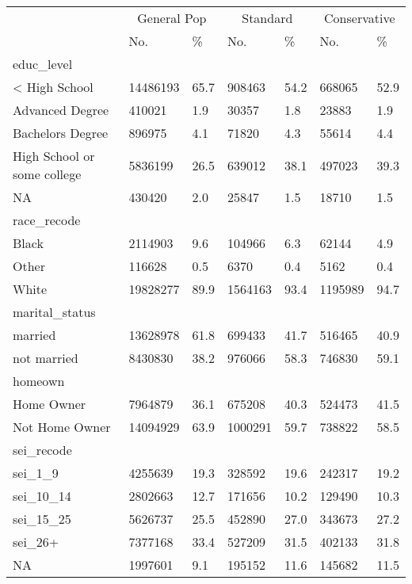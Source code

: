 \captionsetup[table]{labelformat=empty,skip=1pt}
\begin{longtable}{lllllll}
\toprule
& \multicolumn{2}{c}{General Pop} & \multicolumn{2}{c}{Standard} & \multicolumn{2}{c}{Conservative} \\ 
 \cmidrule(lr){2-3}\cmidrule(lr){4-5}\cmidrule(lr){6-7}
 & No. & \% & No. & \% & No. & \% \\ 
\midrule
\multicolumn{1}{l}{educ\_level} \\ 
\midrule
< High School & 14486193 & 65.7 & 908463 & 54.2 & 668065 & 52.9 \\ 
Advanced Degree & 410021 & 1.9 & 30357 & 1.8 & 23883 & 1.9 \\ 
Bachelors Degree & 896975 & 4.1 & 71820 & 4.3 & 55614 & 4.4 \\ 
High School or some college & 5836199 & 26.5 & 639012 & 38.1 & 497023 & 39.3 \\ 
NA & 430420 & 2.0 & 25847 & 1.5 & 18710 & 1.5 \\ 
\midrule
\multicolumn{1}{l}{race\_recode} \\ 
\midrule
Black & 2114903 & 9.6 & 104966 & 6.3 & 62144 & 4.9 \\ 
Other & 116628 & 0.5 & 6370 & 0.4 & 5162 & 0.4 \\ 
White & 19828277 & 89.9 & 1564163 & 93.4 & 1195989 & 94.7 \\ 
\midrule
\multicolumn{1}{l}{marital\_status} \\ 
\midrule
married & 13628978 & 61.8 & 699433 & 41.7 & 516465 & 40.9 \\ 
not married & 8430830 & 38.2 & 976066 & 58.3 & 746830 & 59.1 \\ 
\midrule
\multicolumn{1}{l}{homeown} \\ 
\midrule
Home Owner & 7964879 & 36.1 & 675208 & 40.3 & 524473 & 41.5 \\ 
Not Home Owner & 14094929 & 63.9 & 1000291 & 59.7 & 738822 & 58.5 \\ 
\midrule
\multicolumn{1}{l}{sei\_recode} \\ 
\midrule
sei\_1\_9 & 4255639 & 19.3 & 328592 & 19.6 & 242317 & 19.2 \\ 
sei\_10\_14 & 2802663 & 12.7 & 171656 & 10.2 & 129490 & 10.3 \\ 
sei\_15\_25 & 5626737 & 25.5 & 452890 & 27.0 & 343673 & 27.2 \\ 
sei\_26+ & 7377168 & 33.4 & 527209 & 31.5 & 402133 & 31.8 \\ 
NA & 1997601 & 9.1 & 195152 & 11.6 & 145682 & 11.5 \\ 

\end{longtable}

